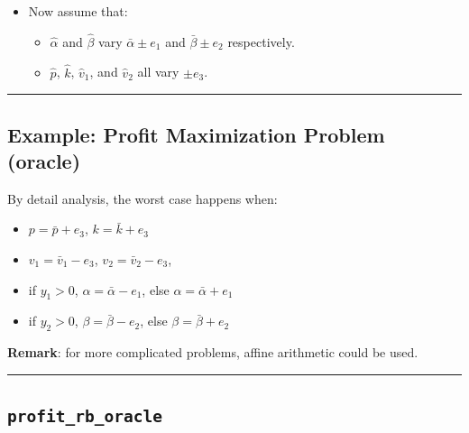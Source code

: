 \documentclass[]{article}
\providecommand{\tightlist}{%
  \setlength{\itemsep}{0pt}\setlength{\parskip}{0pt}}
\begin{document}
\begin{itemize}
\tightlist
\item
  Now assume that:

  \begin{itemize}
  \tightlist
  \item
    \(\hat{\alpha}\) and \(\hat{\beta}\) vary \(\bar{\alpha} \pm e_1\)
    and \(\bar{\beta} \pm e_2\) respectively.
  \item
    \(\hat{p}\), \(\hat{k}\), \(\hat{v}_1\), and \(\hat{v}_2\) all vary
    \(\pm e_3\).
  \end{itemize}
\end{itemize}

\begin{center}\rule{0.5\linewidth}{\linethickness}\end{center}

\hypertarget{example-profit-maximization-problem-oracle}{%
\subsection{Example: Profit Maximization Problem
(oracle)}\label{example-profit-maximization-problem-oracle}}

By detail analysis, the worst case happens when:

\begin{itemize}
\tightlist
\item
  \(p = \bar{p} + e_3\), \(k = \bar{k} + e_3\)
\item
  \(v_1 = \bar{v}_1 - e_3\), \(v_2 = \bar{v}_2 - e_3\),
\item
  if \(y_1 > 0\), \(\alpha = \bar{\alpha} - e_1\), else
  \(\alpha = \bar{\alpha} + e_1\)
\item
  if \(y_2 > 0\), \(\beta = \bar{\beta} - e_2\), else
  \(\beta = \bar{\beta} + e_2\)
\end{itemize}

\textbf{Remark}: for more complicated problems, affine arithmetic could
be used.

\begin{center}\rule{0.5\linewidth}{\linethickness}\end{center}

\hypertarget{profit_rb_oracle}{%
\subsection{\texorpdfstring{\texttt{profit\_rb\_oracle}}{profit\_rb\_oracle}}\label{profit_rb_oracle}}
\end{document}
